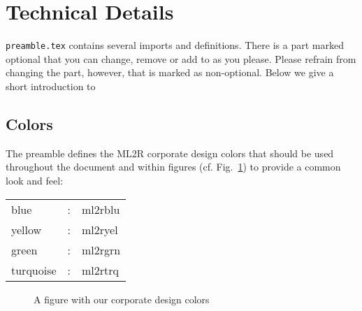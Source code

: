 \documentclass[nonacm,sigconf,fleqn,svgnames,screen]{acmart}
\begin{document}
\section{Technical Details}
\verb+preamble.tex+ contains several imports and definitions. 
There is a part marked optional that you can change, remove or add to as you please. 
Please refrain from changing the part, however, that is marked as non-optional.
Below we give a short introduction to 

\subsection{Colors}
The preamble defines the ML2R corporate design colors that should be used throughout the document and within figures (cf. Fig.~\ref{colors}) to provide a common look and feel:

\vspace{0.5em}
\begin{center}
\begin{tabular}{lcl}
\textcolor{ml2rblu}{blue} & : & \textcolor{ml2rblu}{ml2rblu} \\
\textcolor{ml2ryel}{yellow} & : & \textcolor{ml2ryel}{ml2ryel} \\
\textcolor{ml2rgrn}{green} & : & \textcolor{ml2rgrn}{ml2rgrn} \\
\textcolor{ml2rtrq}{turquoise} & : & \textcolor{ml2rtrq}{ml2rtrq} \\
 \end{tabular} 
\end{center}

\begin{figure}
\caption{A figure with our corporate design colors}
\label{colors}
\end{figure}
\end{document}
